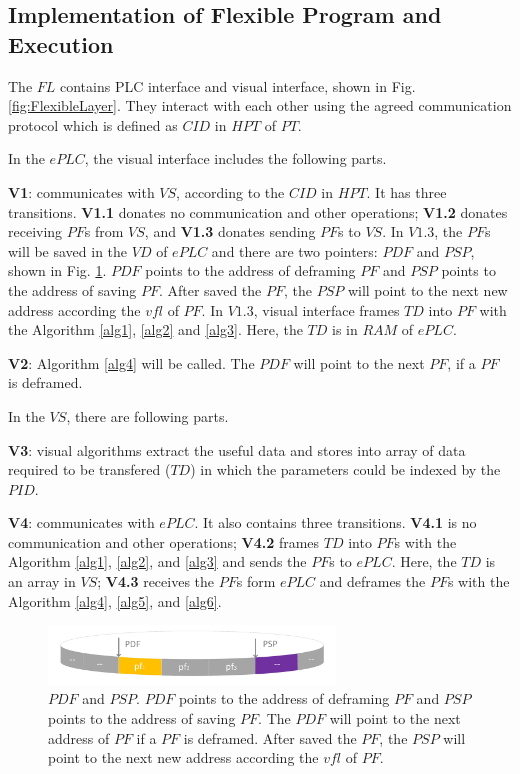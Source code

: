 \documentclass[journal,UTF8]{IEEEtran}
\begin{document}
\subsection{Implementation of Flexible Program and Execution}
The $FL$ contains PLC interface and visual interface, shown in Fig. \ref{fig:FlexibleLayer}. They interact with each other using the agreed communication protocol which is defined as $CID$ in $HPT$ of $PT$. 

In the $ePLC$, the visual interface includes the following parts.

\textbf{V1}: communicates with $VS$, according to the $CID$ in $HPT$. It has three transitions. \textbf{V1.1} donates no communication and other operations; \textbf{V1.2} donates receiving $PF$s from $VS$, and \textbf{V1.3} donates sending $PF$s to $VS$. In $V1.3$, the $PF$s will be saved in the $VD$ of $ePLC$ and there are two pointers: $PDF$ and $PSP$, shown in Fig. \ref{fig:VisualInterface}. $PDF$ points to the address of deframing $PF$ and $PSP$ points to the address of saving $PF$. After saved the $PF$, the $PSP$ will point to the next new address according the $vfl$ of $PF$. In $V1.3$, visual interface frames $TD$ into $PF$ with the Algorithm \ref{alg1}, \ref{alg2} and \ref{alg3}. Here, the $TD$ is in $RAM$ of $ePLC$.

\textbf{V2}: Algorithm \ref{alg4} will be called. The $PDF$ will point to the next $PF$, if a $PF$ is deframed.


In the $VS$, there are following parts.  

\textbf{V3}: visual algorithms extract the useful data and stores into array of data required to be transfered ($TD$) in which the parameters could be indexed by the $PID$.

\textbf{V4}: communicates with $ePLC$. It also contains three transitions. \textbf{V4.1} is no communication and other operations; \textbf{V4.2} frames $TD$ into $PF$s with the Algorithm \ref{alg1}, \ref{alg2}, and \ref{alg3} and sends the $PF$s to $ePLC$. Here, the $TD$ is an array in $VS$; \textbf{V4.3} receives the $PF$s form $ePLC$ and deframes the $PF$s with the Algorithm \ref{alg4}, \ref{alg5}, and \ref{alg6}.

\begin{figure}
	\centering
	\includegraphics[width=3in]{fig/VisualInterface.pdf}
	\caption{ $PDF$ and $PSP$. $PDF$ points to the address of deframing $PF$ and $PSP$ points to the address of saving $PF$. The $PDF$ will point to the next address of $PF$ if a $PF$ is deframed. After saved the $PF$, the $PSP$ will point to the next new address according the $vfl$ of $PF$.}
	\label{fig:VisualInterface}
\end{figure}
\end{document}
